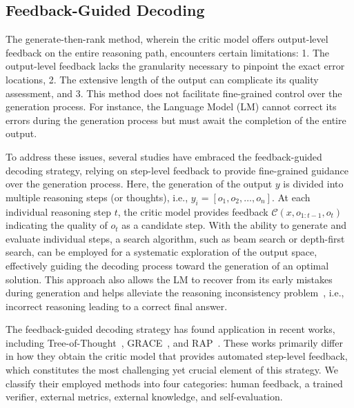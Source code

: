 \documentclass[a4paper,oneside]{book}
\begin{document}
\subsection{Feedback-Guided Decoding}
The generate-then-rank method, wherein the critic model offers output-level feedback on the entire reasoning path, encounters certain limitations: 1. The output-level feedback lacks the granularity necessary to pinpoint the exact error locations, 2. The extensive length of the output can complicate its quality assessment, and 3. This method does not facilitate fine-grained control over the generation process. For instance, the Language Model (LM) cannot correct its errors during the generation process but must await the completion of the entire output.

To address these issues, several studies have embraced the feedback-guided decoding strategy, relying on step-level feedback to provide fine-grained guidance over the generation process. Here, the generation of the output $y$ is divided into multiple reasoning steps (or thoughts), i.e., $y_{i}=\left[o_{1}, o_{2}, \ldots, o_{n}\right]$. At each individual reasoning step $t$, the critic model provides feedback $\mathcal{C}\left(x, o_{1: t-1}, o_{t}\right)$ indicating the quality of $o_{t}$ as a candidate step. With the ability to generate and evaluate individual steps, a search algorithm, such as beam search or depth-first search, can be employed for a systematic exploration of the output space, effectively guiding the decoding process toward the generation of an optimal solution. This approach also allows the LM to recover from its early mistakes during generation and helps alleviate the reasoning inconsistency problem~\cite{zelikman2022star, creswell2022faithful}, i.e., incorrect reasoning leading to a correct final answer.

The feedback-guided decoding strategy has found application in recent works, including Tree-of-Thought~\cite{yao2023tree}, GRACE~\cite{khalifa2023grace}, and RAP~\cite{hao2023reasoning}. These works primarily differ in how they obtain the critic model that provides automated step-level feedback, which constitutes the most challenging yet crucial element of this strategy. We classify their employed methods into four categories: human feedback, a trained verifier, external metrics, external knowledge, and self-evaluation.
\end{document}
